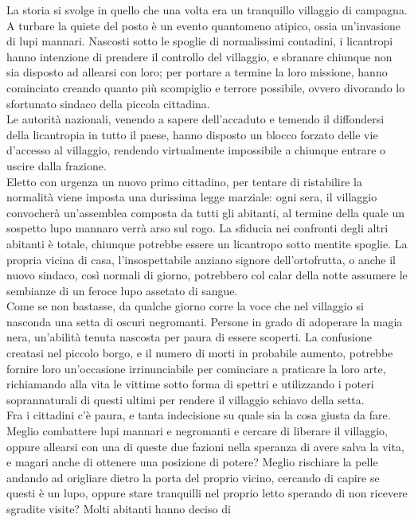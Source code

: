 \documentclass[a4paper,10pt]{article}
\begin{document}
La storia si svolge in quello che una volta era un tranquillo villaggio di
campagna. A turbare la quiete del posto è un evento quantomeno atipico, ossia
un'invasione di lupi mannari. Nascosti sotto le spoglie di normalissimi
contadini, i licantropi hanno intenzione di prendere il controllo del villaggio,
e sbranare chiunque non sia disposto ad allearsi con loro; per portare a termine
la loro missione, hanno cominciato creando quanto più scompiglio e terrore
possibile, ovvero divorando lo sfortunato sindaco della piccola cittadina.\\
Le autorità nazionali, venendo a sapere dell'accaduto e temendo il diffondersi
della licantropia in tutto il paese, hanno disposto un blocco forzato delle vie
d'accesso al villaggio, rendendo virtualmente impossibile a chiunque entrare o
uscire dalla frazione.\\
Eletto con urgenza un nuovo primo cittadino, per tentare di ristabilire la
normalità viene imposta una durissima legge marziale: ogni sera, il villaggio
convocherà un'assemblea composta da tutti gli abitanti, al termine della quale
un sospetto lupo mannaro verrà arso sul rogo. La sfiducia nei confronti degli
altri abitanti è totale, chiunque potrebbe essere un licantropo sotto mentite
spoglie. La propria vicina di casa, l'insospettabile anziano signore
dell'ortofrutta, o anche il nuovo sindaco, così normali di giorno, potrebbero
col calar della notte assumere le sembianze di un feroce lupo assetato di
sangue.\\
Come se non bastasse, da qualche giorno corre la voce che nel villaggio si
nasconda una setta di oscuri negromanti. Persone in grado di adoperare la magia
nera, un'abilità tenuta nascosta per paura di essere scoperti. La confusione
creatasi nel piccolo borgo, e il numero di morti in probabile aumento, potrebbe
fornire loro un'occasione irrinunciabile per cominciare a praticare la loro
arte, richiamando alla vita le vittime sotto forma di spettri e utilizzando i
poteri soprannaturali di questi ultimi per rendere il villaggio schiavo della
setta.\\
Fra i cittadini c'è paura, e tanta indecisione su quale sia la cosa giusta da
fare. Meglio combattere lupi mannari e negromanti e cercare di liberare il
villaggio, oppure allearsi con una di queste due fazioni nella speranza di avere
salva la vita, e magari anche di ottenere una posizione di potere? Meglio
rischiare la pelle andando ad origliare dietro la porta del proprio vicino,
cercando di capire se questi è un lupo, oppure stare tranquilli nel proprio
letto sperando di non ricevere sgradite visite? Molti abitanti hanno deciso di
\end{document}

